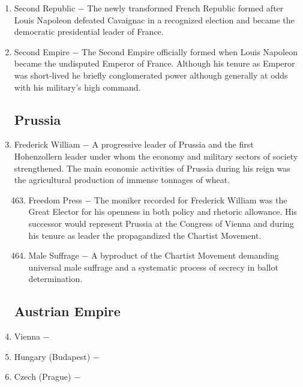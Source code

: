 \documentclass[12pt]{article}
\begin{document}
\begin{enumerate}
\item Second Republic $-$ The newly transformed French Republic formed after Louis Napoleon defeated Cavaignac in a recognized election and became the democratic presidential leader of France.

\item Second Empire $-$ The Second Empire officially formed when Louis Napoleon became the undisputed Emperor of France. Although his tenure as Emperor was short-lived he briefly conglomerated power although generally at odds with his military's high command.

\subsection{Prussia}

\item Frederick William $-$ A progressive leader of Prussia and the first Hohenzollern leader under whom the economy and military sectors of society strengthened. The main economic activities of Prussia during his reign was the agricultural production of immense tonnages of wheat.

\begin{enumerate}[label=\arabic{*}.]
\setcounter{enumii}{462}

\item Freedom Press $-$ The moniker recorded for Frederick William was the Great Elector for his openness in both policy and rhetoric allowance. His successor would represent Prussia at the Congress of Vienna and during his tenure as leader the propagandized the Chartist Movement.

\item Male Suffrage $-$ A byproduct of the Chartist Movement demanding universal male suffrage and a systematic process of secrecy in ballot determination.

\end{enumerate}
\setcounter{enumi}{464}

\subsection{Austrian Empire}

\item Vienna $-$ 

\item Hungary (Budapest) $-$ 

\item Czech (Prague) $-$ 


\end{enumerate}
\end{document}
